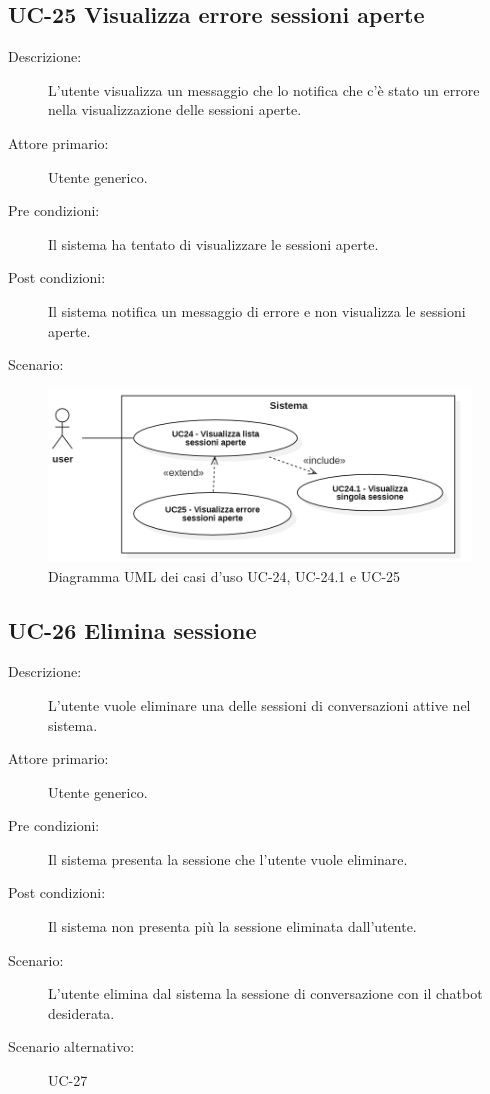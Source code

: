 \subsection{UC-25 Visualizza errore sessioni aperte }
\begin{description}
    \item[Descrizione:] L'utente visualizza un messaggio che lo notifica che c'è stato un errore nella visualizzazione delle sessioni aperte.
    \item[Attore primario:] Utente generico.
    \item[Pre condizioni:] Il sistema ha tentato di visualizzare le sessioni aperte.
    \item[Post condizioni:] Il sistema notifica un messaggio di errore e non visualizza le sessioni aperte.
    \item[Scenario:] 
\end{description}

\begin{figure}[H]
    \centering
    \includegraphics[width=0.8\linewidth]{UC24-25.PNG}
    \caption{Diagramma UML dei casi d'uso UC-24, UC-24.1 e UC-25}
    \label{fig:UC24-25}
\end{figure}

\subsection{UC-26 Elimina sessione}
\begin{description}
    \item[Descrizione:] L'utente vuole eliminare una delle sessioni di conversazioni attive nel sistema.
    \item[Attore primario:] Utente generico.
    \item[Pre condizioni:] Il sistema presenta la sessione che l'utente vuole eliminare.
    \item[Post condizioni:] Il sistema non presenta più la sessione eliminata dall'utente.
    \item[Scenario:] L'utente elimina dal sistema la sessione di conversazione con il chatbot desiderata.
    \item[Scenario alternativo:] UC-27
\end{description}

